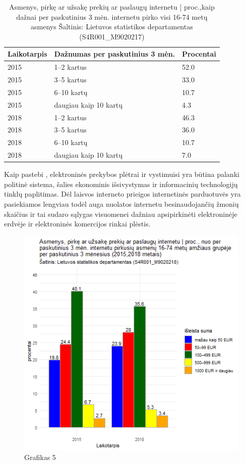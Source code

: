 \documentclass[12pt, titlepage]{article}
\begin{document}
\smallskip
\begin{table}[H]
\centering
\caption{Asmenys, pirkę ar užsakę prekių ar paslaugų internetu | proc.,kaip dažnai per paskutinius 3 mėn. internetu pirko visi 16-74 metų asmenys
Šaltinis: Lietuvos statistikos departamentas (S4R001\_M9020217)}
\label{tab:4}
\begin{tabular}{|l|l|l|}
\hline
Laikotarpis & Dažnumas per paskutinius 3 mėn. & Procentai \\ \hline
2015        & 1–2 kartus                      & 52.0      \\ \hline
2015        & 3–5 kartus                      & 33.0      \\ \hline
2015        & 6–10 kartų                      & 10.7      \\ \hline
2015        & daugiau kaip 10 kartų           & 4.3       \\ \hline
2018        & 1–2 kartus                      & 46.3      \\ \hline
2018        & 3–5 kartus                      & 36.0      \\ \hline
2018        & 6–10 kartų                      & 10.7      \\ \hline
2018        & daugiau kaip 10 kartų           & 7.0       \\ \hline
\end{tabular}
\end{table}
\smallskip
\par
Kaip pastebi \textcite{vsvcerbinskaite2018elektronines}, elektroninės prekybos plėtrai ir vystimuisi yra būtina palanki politinė sistema, šalies ekonominis išsivystymas ir informacinių technologijų tinklų paplitimas. Dėl laisvos interneto prieigos internetinės parduotuvės yra pasiekiamos lengviau todėl auga nuolatos internetu besinaudojančių žmonių skaičius ir tai sudaro sąlygas visuomenei dažniau apsipirkinėti elektroninėje erdvėje  ir elektroninės komercijos rinkai plėstis.
\smallskip
\begin{figure}[H]
\center
\includegraphics[scale=0.8]{Grafikai/6.png} 
\caption{Grafikas 5}
\label{fig:6}
\end{figure}
\end{document}

